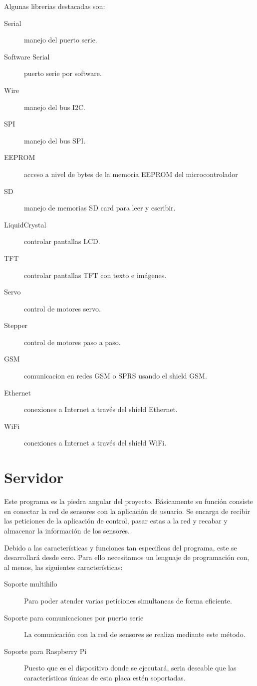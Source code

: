 Algunas librerias destacadas son:
\begin{description}
    \item[Serial] manejo del puerto serie.
    \item[Software Serial] puerto serie por software.
    \item[Wire] manejo del bus I2C.
    \item[SPI] manejo del bus SPI.
    \item[EEPROM] acceso a nivel de bytes de la memoria EEPROM del microcontrolador
    \item[SD] manejo de memorias SD card para leer y escribir.
    \item[LiquidCrystal] controlar pantallas LCD.
    \item[TFT] controlar pantallas TFT con texto e imágenes.
    \item[Servo] control de motores servo.
    \item[Stepper] control de motores paso a paso.
    \item[GSM] comunicacion en redes GSM o SPRS usando el shield GSM.
    \item[Ethernet] conexiones a Internet a través del shield Ethernet.
    \item[WiFi] conexiones a Internet a través del shield WiFi.
\end{description}


\section{Servidor}
Este programa es la piedra angular del proyecto. Básicamente su función consiste en conectar la red de sensores con la aplicación de usuario. Se encarga de recibir las peticiones de la aplicación de control, pasar estas a la red y recabar y almacenar la información de los sensores. 

Debido a las características y funciones tan especificas del programa, este se desarrollará desde cero. Para ello necesitamos un lenguaje de programación con, al menos, las siguientes características:
\begin{description}
    \item[Soporte multihilo] Para poder atender varias peticiones simultaneas de forma eficiente.
    \item[Soporte para comunicaciones por puerto serie] La comunicación con la red de sensores se realiza mediante este método.
    \item[Soporte para Raspberry Pi] Puesto que es el dispositivo donde se ejecutará, seria deseable que las características únicas de esta placa estén soportadas.
 \end{description}
 
